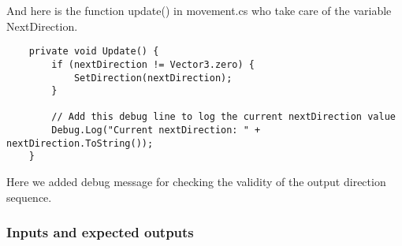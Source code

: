 \documentclass[11pt]{article}
\begin{document}
    And here is the function update() in movement.cs who take care of the variable NextDirection.

    \begin{lstlisting}
    private void Update() {
        if (nextDirection != Vector3.zero) {
            SetDirection(nextDirection);
        }
    
        // Add this debug line to log the current nextDirection value
        Debug.Log("Current nextDirection: " + nextDirection.ToString());
    }
    \end{lstlisting}
    
    Here we added debug message for checking the validity of the output direction sequence.
    
    \subsubsection*{Inputs and expected outputs}
\end{document}
